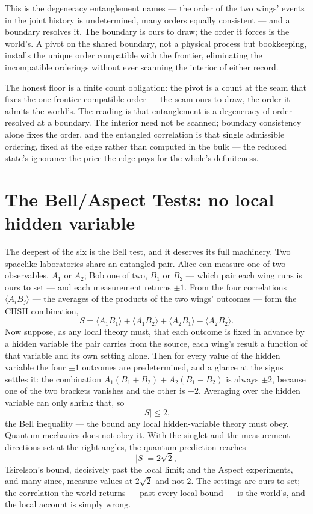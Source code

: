 This is the degeneracy entanglement names --- the
order of the two wings' events in the joint history is undetermined, many orders equally consistent --- and a
boundary resolves it. The boundary is ours to draw; the order it forces is the world's. A pivot on the shared
boundary, not a physical process but bookkeeping, installs the
unique order compatible with the frontier, eliminating the incompatible orderings without ever scanning the
interior of either record.

The honest floor is a finite count obligation: the pivot is a count at the seam that fixes the one
frontier-compatible order --- the seam ours to draw, the order it admits the world's. The reading is that
entanglement is a degeneracy of order resolved at a boundary.
The interior need not be scanned; boundary consistency alone fixes the order, and the entangled correlation is
that single admissible ordering, fixed at the edge rather than computed in the bulk --- the reduced state's
ignorance the price the edge pays for the whole's definiteness.

\section{The Bell/Aspect Tests: no local hidden variable}
\label{se:bell}

The deepest of the six is the Bell test, and it deserves its full machinery. Two spacelike laboratories share
an entangled pair. Alice can measure one of two observables, $A_1$ or $A_2$; Bob one of two, $B_1$ or $B_2$ ---
which pair each wing runs is ours to set --- and each measurement returns $\pm 1$. From the four correlations $\langle A_i B_j\rangle$ --- the averages of the
products of the two wings' outcomes --- form the CHSH combination,
\begin{equation}
  S = \langle A_1 B_1\rangle + \langle A_1 B_2\rangle + \langle A_2 B_1\rangle - \langle A_2 B_2\rangle .
\end{equation}
Now suppose, as any local theory must, that each outcome is fixed in advance by a hidden variable the pair
carries from the source, each wing's result a function of that variable and its own setting alone. Then for
every value of the hidden variable the four $\pm 1$ outcomes are predetermined, and a glance at the signs
settles it: the combination $A_1(B_1 + B_2) + A_2(B_1 - B_2)$ is always $\pm 2$, because one of the two
brackets vanishes and the other is $\pm 2$. Averaging over the hidden variable can only shrink that, so
\begin{equation}
  |S| \le 2,
\end{equation}
the Bell inequality --- the bound any local hidden-variable theory must obey. Quantum mechanics does not obey
it. With the singlet and the measurement directions set at the right angles, the quantum prediction reaches
\begin{equation}
  |S| = 2\sqrt{2},
\end{equation}
Tsirelson's bound, decisively past the local limit; and the Aspect experiments, and many since, measure values
at $2\sqrt2$ and not $2$. The settings are ours to set; the correlation the world returns --- past every local
bound --- is the world's, and the local account is simply wrong.

